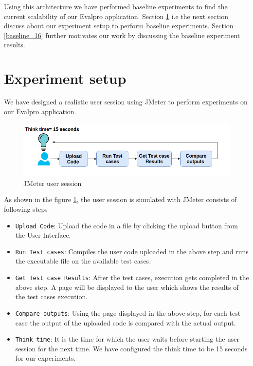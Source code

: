 \documentclass{iitbreport}
\begin{document}
Using this architecture we have performed baseline experiments to find the current scalability of our Evalpro application.  Section \ref{baseline_experiemnt_setup} i.e the next section discuss about our experiment setup to perform baseline experiments. Section \ref{baseline_16} further motivates our work by discussing the baseline experiment results.

\section{Experiment setup}\label{baseline_experiemnt_setup}
We have designed a realistic user session using JMeter to perform experiments on our Evalpro application.
\begin{figure}[!htb]
  \centering
  \includegraphics[width=\linewidth]{Images/user_session.png}
  \caption{JMeter user session}
  \label{user_session}
  
\end{figure}
As shown in the figure \ref{user_session}, the user session is simulated with JMeter consists of following steps
\begin{itemize}
\item {\texttt{Upload Code}}: Upload the code in a file by clicking the upload button from the User Interface.
 \item {\texttt{Run Test cases}}: Compiles the user code uploaded in the above step and runs the executable file on the available test cases.
\item {\texttt{Get Test case Results}}: After the test cases, execution gets completed in the above step. A page will be displayed to the user which shows the results of the test cases execution.
\item {\texttt{Compare outputs}}: Using the page displayed in the above step, for each test case the output of the uploaded code is compared with the actual output.
\item {\texttt{Think time}}: It is the time for which the user waits before starting the user session for the next time. We have configured the think time to be 15 seconds for our experiments.
\end{itemize}
\end{document}
